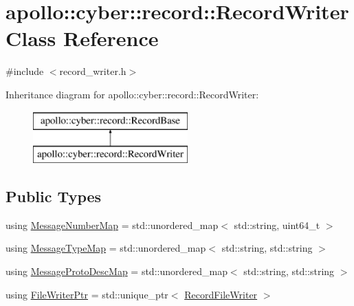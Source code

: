 \hypertarget{classapollo_1_1cyber_1_1record_1_1RecordWriter}{\section{apollo\-:\-:cyber\-:\-:record\-:\-:Record\-Writer Class Reference}
\label{classapollo_1_1cyber_1_1record_1_1RecordWriter}
}


{\ttfamily \#include $<$record\-\_\-writer.\-h$>$}

Inheritance diagram for apollo\-:\-:cyber\-:\-:record\-:\-:Record\-Writer\-:\begin{figure}[H]
\begin{center}
\leavevmode
\includegraphics[height=2.000000cm]{classapollo_1_1cyber_1_1record_1_1RecordWriter}
\end{center}
\end{figure}
\subsection*{Public Types}
\begin{DoxyCompactItemize}
\item 
using \hyperlink{classapollo_1_1cyber_1_1record_1_1RecordWriter_a2eee5f400e4db03ec9101258d8e819ab}{Message\-Number\-Map} = std\-::unordered\-\_\-map$<$ std\-::string, uint64\-\_\-t $>$
\item 
using \hyperlink{classapollo_1_1cyber_1_1record_1_1RecordWriter_a199b00d29dde82c7a061b4ee2b6204d3}{Message\-Type\-Map} = std\-::unordered\-\_\-map$<$ std\-::string, std\-::string $>$
\item 
using \hyperlink{classapollo_1_1cyber_1_1record_1_1RecordWriter_a19879e77c64a35d8e8d49d39798c25cb}{Message\-Proto\-Desc\-Map} = std\-::unordered\-\_\-map$<$ std\-::string, std\-::string $>$
\item 
using \hyperlink{classapollo_1_1cyber_1_1record_1_1RecordWriter_a9711b0e51bbbd4dbe54e44c3d1fbd9da}{File\-Writer\-Ptr} = std\-::unique\-\_\-ptr$<$ \hyperlink{classapollo_1_1cyber_1_1record_1_1RecordFileWriter}{Record\-File\-Writer} $>$
\end{DoxyCompactItemize}
